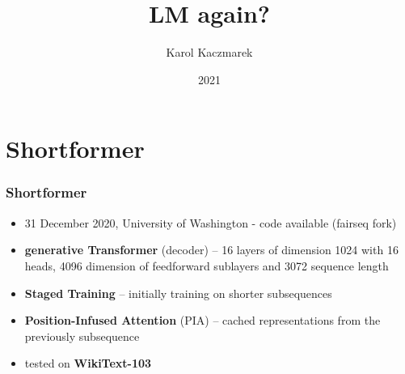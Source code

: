 \documentclass{beamer}
\title{LM again?}
\date{2021}
\author{Karol Kaczmarek}
\begin{document}
\begin{frame}
    \titlepage
\end{frame}

\section{Shortformer}
\begin{frame}
    \frametitle{Shortformer \cite{shortformer}}
    \begin{itemize}
        \item 31 December 2020, University of Washington - code available (fairseq fork)
        \item \textbf{generative Transformer} (decoder) -- 16 layers of dimension 1024 with 16 heads, 4096 dimension of feedforward sublayers and 3072 sequence length
        \item \textbf{Staged Training} -- initially training on shorter subsequences
        \item \textbf{Position-Infused Attention} (PIA) -- cached representations from the previously subsequence
        \item tested on \textbf{WikiText-103}
    \end{itemize}
\end{frame}
\end{document}
